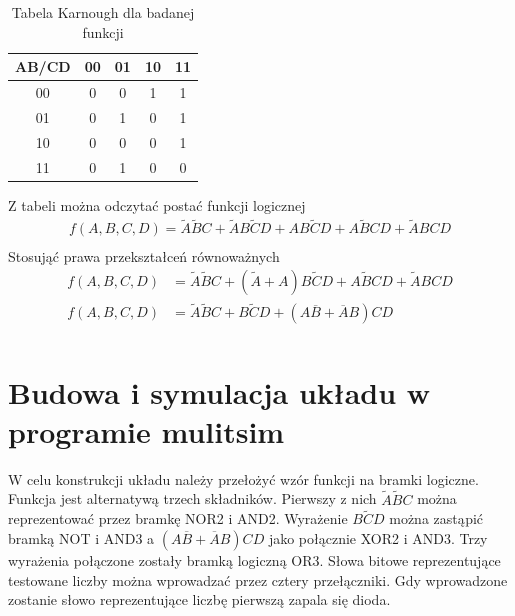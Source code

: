 \documentclass[12pt,a4paper,openright]{mwrep}
\begin{document}
\begin{table}[h!]
    \centering
    \begin{tabular}{|c|cccc|}
        \hline
        AB/CD & 00 & 01 & 10 & 11 \\
        \hline
        00 & 0 & 0 & 1 & 1 \\
        01 & 0 & 1 & 0 & 1 \\
        10 & 0 & 0 & 0 & 1 \\
        11 & 0 & 1 & 0 & 0 \\
        \hline
    \end{tabular}
    \caption{Tabela Karnough dla badanej funkcji}
\end{table}
Z tabeli można odczytać postać funkcji logicznej
\begin{align*}
    f(A,B,C,D) = \widetilde{A} \widetilde{B} C + \widetilde{A}B\widetilde{C}D 
    + AB\widetilde{C}D + A\widetilde{B}CD + \widetilde{A}BCD   \\ 
\end{align*}
Stosująć prawa przekształceń równoważnych
\begin{align*}
    f(A,B,C,D) &= \widetilde{A} \widetilde{B} C + (\widetilde{A}  
    + A)B\widetilde{C}D + A\widetilde{B}CD + \widetilde{A}BCD   \\ 
    f(A,B,C,D) &= \widetilde{A} \widetilde{B} C 
    + B\widetilde{C}D + (A\overline{B} + \overline{A}B)CD\\
\end{align*}
\section{Budowa i symulacja układu w programie mulitsim}
W celu konstrukcji układu należy przełożyć wzór funkcji na bramki logiczne.
Funkcja jest alternatywą trzech składników.
Pierwszy z nich $ \widetilde{A} \widetilde{B} C $ można reprezentować
przez bramkę NOR2 i AND2. Wyrażenie $ B\widetilde{C}D $ można zastąpić bramką NOT i AND3
a $ (A\overline{B} + \overline{A}B)CD $ jako połącznie XOR2 i AND3.
Trzy wyrażenia połączone zostały bramką logiczną OR3. 
Słowa bitowe reprezentujące testowane liczby można wprowadzać przez cztery przełączniki.
Gdy wprowadzone zostanie słowo reprezentujące liczbę pierwszą zapala się dioda.
\end{document}
